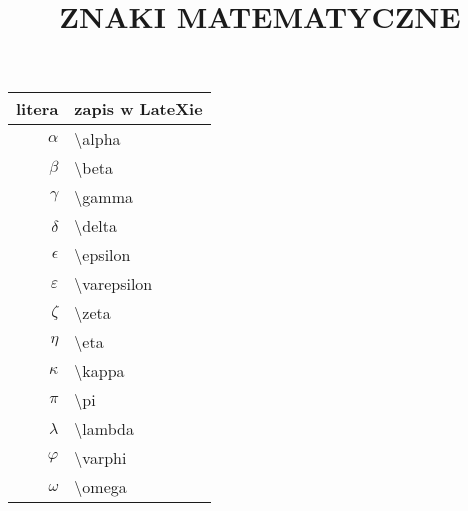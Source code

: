 \documentclass{article}
\begin{document}
\large
\begin{center}
\begin{tabular}{|r|l|}

\hline
litera & zapis w LateXie\\
\hline
$\alpha$ & \textbackslash alpha \\
$\beta$ & \textbackslash beta \\
$\gamma$ & \textbackslash gamma \\
$\delta$ & \textbackslash delta \\
$\epsilon$ & \textbackslash epsilon \\
$\varepsilon$ & \textbackslash varepsilon \\
$\zeta$ & \textbackslash zeta \\
$\eta$ & \textbackslash eta \\
\Huge $\kappa$ & \Huge \textbackslash kappa \\
$\pi$ & \textbackslash pi \\
$\lambda$ & \textbackslash lambda \\
$\varphi$ & \textbackslash varphi\\
$\omega$ & \textbackslash omega\\
\hline
\end{tabular}
\end{center}
\newpage
\begin{center}
\title{\Large ZNAKI MATEMATYCZNE}
\end{center}
\end{document}
